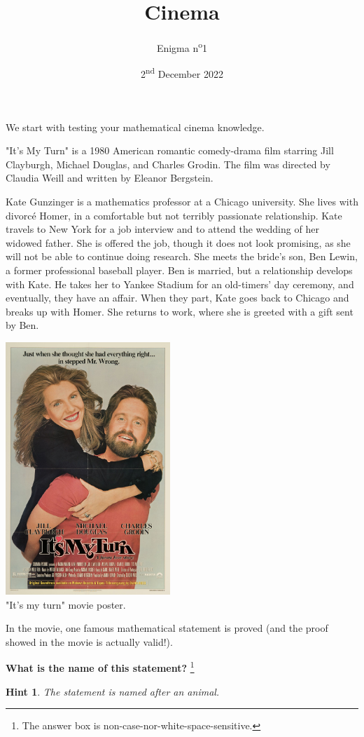\documentclass[a4paper, top=10mm]{article}
\title{\textbf{\huge{Cinema}}}
\author{Enigma n\textsuperscript{o}1}
\date{2\textsuperscript{nd} December 2022}
\newtheorem*{hint}{Hint}
\begin{document}
	\maketitle
	
	We start with testing your mathematical cinema knowledge.
	
	"It's My Turn" is a 1980 American romantic comedy-drama film starring Jill Clayburgh, Michael Douglas, and Charles Grodin.
	The film was directed by Claudia Weill and written by Eleanor Bergstein.
	
	Kate Gunzinger is a mathematics professor at a Chicago university. She lives with divorcé Homer, in a comfortable but not terribly passionate relationship.
	Kate travels to New York for a job interview and to attend the wedding of her widowed father. She is offered the job, though it does not look promising, as she will not be able to continue doing research. She meets the bride's son, Ben Lewin, a former professional baseball player.
	Ben is married, but a relationship develops with Kate. He takes her to Yankee Stadium for an old-timers' day ceremony, and eventually, they have an affair. When they part, Kate goes back to Chicago and breaks up with Homer. She returns to work, where she is greeted with a gift sent by Ben.
	
	\begin{center}
		\includegraphics[height=270pt]{01its_my_turn.jpg}\\
		"It's my turn" movie poster.
	\end{center}


	In the movie, one famous mathematical statement is proved (and the proof showed in the movie is actually valid!).
	
	\textbf{What is the name of this statement?}
	\footnote{The answer box is non-case-nor-white-space-sensitive.}
	
	\begin{hint}
		The statement is named after an animal.
	\end{hint}


	
\end{document}
